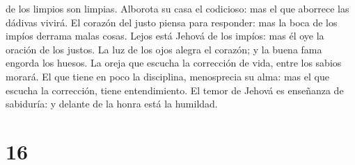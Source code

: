 de los limpios son limpias.  Alborota su casa el
codicioso: mas el que aborrece las dádivas vivirá.  El
corazón del justo piensa para responder: mas la boca de los impíos
derrama malas cosas.  Lejos está Jehová de los impíos:
mas él oye la oración de los justos.  La luz de los ojos
alegra el corazón; y la buena fama engorda los huesos. 
La oreja que escucha la corrección de vida, entre los sabios morará.
 El que tiene en poco la disciplina, menosprecia su alma:
mas el que escucha la corrección, tiene entendimiento. 
El temor de Jehová es enseñanza de sabiduría: y delante de la honra está
la humildad.

\hypertarget{section-15}{%
\section{16}\label{section-15}}

